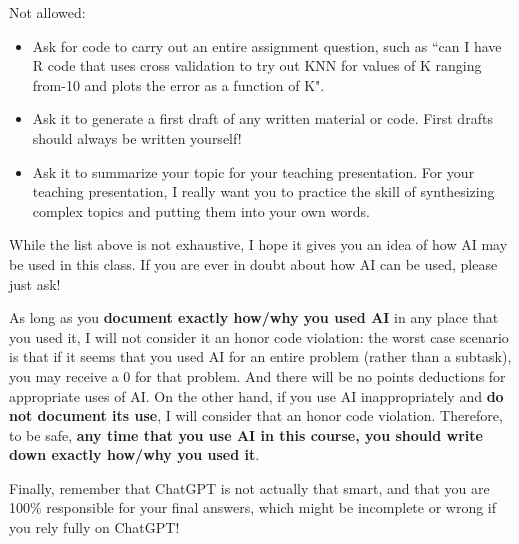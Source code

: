 \documentclass[11pt]{article}
\begin{document}
\noindent Not allowed:
\begin{itemize}
\item Ask for code to carry out an entire assignment question, such as ``can I have R code that uses cross validation to try out KNN for values of K ranging from-10 and plots the error as a function of K".
\item Ask it to generate a first draft of any written material or code. First drafts should always be written yourself! 
\item Ask it to summarize your topic for your teaching presentation. For your teaching presentation, I really want you to practice the skill of synthesizing complex topics and putting them into your own words.
\end{itemize}
While the list above is not exhaustive, I hope it gives you an idea of how AI may be used in this class. If you are ever in doubt about how AI can be used, please just ask! 

As long as you \textbf{document exactly how/why you used AI} in any place that you used it, I will not consider it an honor code violation: the worst case scenario is that if it seems that you used AI for an entire problem (rather than a subtask), you may receive a $0$ for that problem. And there will be no points deductions for appropriate uses of AI. On the other hand, if you use AI inappropriately and \textbf{do not document its use}, I will consider that an honor code violation. Therefore, to be safe, \textbf{any time that you use AI in this course, you should write down exactly how/why you used it}. 

Finally, remember that ChatGPT is not actually that smart, and that you are 100\% responsible for your final answers, which might be incomplete or wrong if you rely fully on ChatGPT! 



\end{document}
